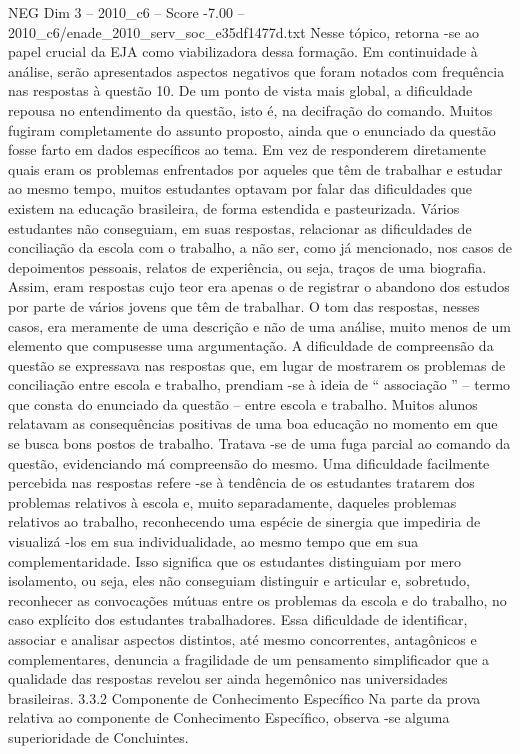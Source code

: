 \begin{textsample}{NEG Dim 3 – 2010\_c6 – Score -7.00 – 2010\_c6/enade\_2010\_serv\_soc\_e35df1477d.txt}
Nesse tópico, retorna -se ao papel crucial da EJA como viabilizadora dessa formação.
Em continuidade à análise, serão apresentados aspectos negativos que foram notados com frequência nas respostas à questão 10.
De um ponto de vista mais global, a dificuldade repousa no entendimento da questão, isto é, na decifração do comando.
Muitos fugiram completamente do assunto proposto, ainda que o enunciado da questão fosse farto em dados específicos ao tema.
Em vez de responderem diretamente quais eram os problemas enfrentados por aqueles que têm de trabalhar e estudar ao mesmo tempo, muitos estudantes optavam por falar das dificuldades que existem na educação brasileira, de forma estendida e pasteurizada.
Vários estudantes não conseguiam, em suas respostas, relacionar as dificuldades de conciliação da escola com o trabalho, a não ser, como já mencionado, nos casos de depoimentos pessoais, relatos de experiência, ou seja, traços de uma biografia.
Assim, eram respostas cujo teor era apenas o de registrar o abandono dos estudos por parte de vários jovens que têm de trabalhar.
O tom das respostas, nesses casos, era meramente de uma descrição e não de uma análise, muito menos de um elemento que compusesse uma argumentação.
A dificuldade de compreensão da questão se expressava nas respostas que, em lugar de mostrarem os problemas de conciliação entre escola e trabalho, prendiam -se à ideia de “ associação ” – termo que consta do enunciado da questão – entre escola e trabalho.
Muitos alunos relatavam as consequências positivas de uma boa educação no momento em que se busca bons postos de trabalho.
Tratava -se de uma fuga parcial ao comando da questão, evidenciando má compreensão do mesmo.
Uma dificuldade facilmente percebida nas respostas refere -se à tendência de os estudantes tratarem dos problemas relativos à escola e, muito separadamente, daqueles problemas relativos ao trabalho, reconhecendo uma espécie de sinergia que impediria de visualizá -los em sua individualidade, ao mesmo tempo que em sua complementaridade.
Isso significa que os estudantes distinguiam por mero isolamento, ou seja, eles não conseguiam distinguir e articular e, sobretudo, reconhecer as convocações mútuas entre os problemas da escola e do trabalho, no caso explícito dos estudantes trabalhadores.
Essa dificuldade de identificar, associar e analisar aspectos distintos, até mesmo concorrentes, antagônicos e complementares, denuncia a fragilidade de um pensamento simplificador que a qualidade das respostas revelou ser ainda hegemônico nas universidades brasileiras. 3.3.2 Componente de Conhecimento Específico Na parte da prova relativa ao componente de Conhecimento Específico, observa -se alguma superioridade de Concluintes.

\end{textsample}
